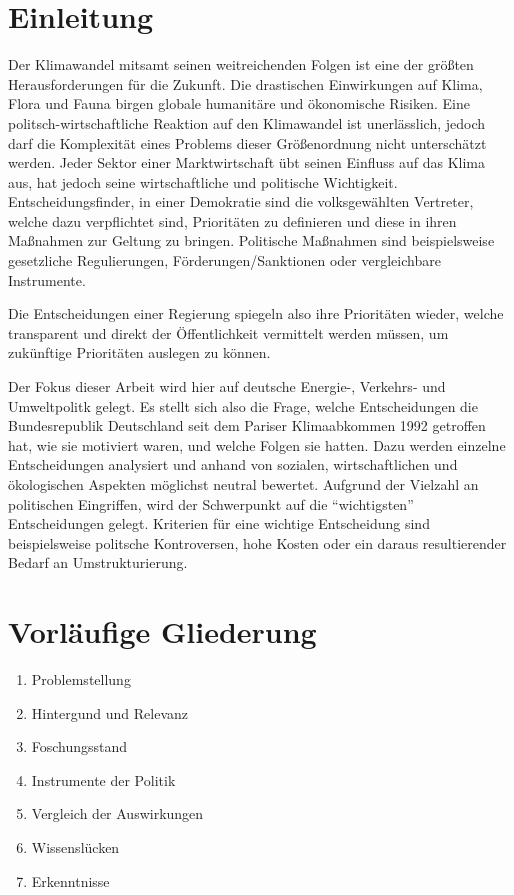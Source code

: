 \documentclass[12pt,a4paper]{article}
\title{\titlename}
\author{ Maylis Grune, Muhamedbaqir Al-Rumeil, Niklas Schmidt}
\date{\exposedate}
\begin{document}


\maketitle

\section*{Einleitung}

Der Klimawandel mitsamt seinen weitreichenden Folgen ist  eine der größten Herausforderungen für die Zukunft. 
Die drastischen Einwirkungen auf Klima, Flora und Fauna \autocite{Consequences:2023}
birgen globale humanitäre und ökonomische Risiken. 
Eine politsch-wirtschaftliche Reaktion auf den Klimawandel ist unerlässlich, 
jedoch darf die Komplexität eines Problems dieser Größenordnung nicht unterschätzt werden. Jeder Sektor einer Marktwirtschaft übt seinen 
Einfluss auf das Klima aus, hat jedoch seine wirtschaftliche und politische Wichtigkeit. 
Entscheidungsfinder, in einer Demokratie sind die volksgewählten Vertreter, welche dazu verpflichtet sind, Prioritäten zu definieren und diese in 
ihren Maßnahmen zur Geltung zu bringen. Politische Maßnahmen sind beispielsweise gesetzliche Regulierungen, Förderungen/Sanktionen oder vergleichbare Instrumente. 

Die Entscheidungen einer Regierung spiegeln also ihre Prioritäten wieder, welche transparent und direkt der Öffentlichkeit vermittelt werden müssen, 
um zukünftige Prioritäten auslegen zu können. 

Der Fokus dieser Arbeit wird hier auf deutsche Energie-, Verkehrs- und Umweltpolitk gelegt. Es stellt sich also die Frage, welche Entscheidungen die 
Bundesrepublik Deutschland seit dem Pariser Klimaabkommen 1992 getroffen hat, wie sie motiviert waren, und welche Folgen sie hatten. 
Dazu werden einzelne Entscheidungen analysiert und anhand von sozialen, wirtschaftlichen und ökologischen Aspekten möglichst neutral bewertet. 
Aufgrund der Vielzahl an politischen Eingriffen, wird der Schwerpunkt auf die “wichtigsten” Entscheidungen gelegt. Kriterien für eine wichtige 
Entscheidung sind beispielsweise politsche Kontroversen, hohe Kosten oder ein daraus resultierender Bedarf an Umstrukturierung. 

\pagebreak
\section*{Vorläufige Gliederung}
\begin{enumerate}
	\item Problemstellung
	\item Hintergund und Relevanz
	\item Foschungsstand
	\item Instrumente der Politik
	\item Vergleich der Auswirkungen
	\item Wissenslücken
	\item Erkenntnisse
\end{enumerate}
\end{document}
